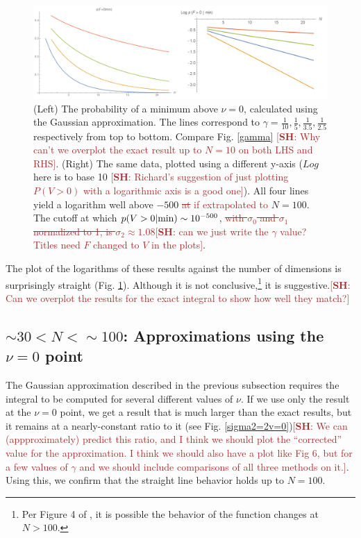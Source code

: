 \documentclass[12pt]{article}
\newcommand{\SH}[1]{\textcolor{brown}{[{\bf SH}: #1]}}
\newcommand{\sh}[1]{\textcolor{brown}{#1}}
\begin{document}
\begin{figure} 
  \centering
  \includegraphics[width=\linewidth]{PVaryingWithNGaussian.png}
  \caption{(Left) The probability of a minimum above $\nu=0$, calculated using the Gaussian approximation. The lines correspond to $\gamma = \frac{1}{10}, \frac{1}{5}, \frac{1}{3.5}, \frac{1}{2.5}$ respectively from top to bottom. Compare Fig. \ref{gamma} \SH{Why can't we overplot the exact result up to $N=10$ on both LHS and RHS}. (Right) The same data, plotted using a different y-axis ($Log$ here is to base 10 \SH{Richard's suggestion of just plotting $P(V>0)$ with a logarithmic axis is a good one}). All four lines yield a logarithm well above $-500$ \sh{\sout{at} if extrapolated to} $N=100$. The cutoff at which $p(V>0|{\rm min}) \sim 10^{-500}$, \sh{\sout{with $\sigma_0$ and $\sigma_1$ normalized to 1,  is $\sigma_2 \approx 1.08$}}\SH{can we just write the $\gamma$ value? Titles need $F$ changed to $V$ in the plots}.}
  \label{PVaryingWithNGaussian}
\end{figure}
  
The plot of the logarithms of these results against the number of dimensions is surprisingly straight (Fig. \ref{PVaryingWithNGaussian}). Although it is not conclusive,\footnote{Per Figure 4 of \cite{Yamada2018}, it is possible the behavior of the function changes at $N >100$.} it is suggestive.\SH{Can we overplot the results for the exact integral to show how well they match?}

\subsection{$\sim 30 < N < \sim100$: Approximations using the $\nu=0$ point}

The Gaussian approximation described in the previous subsection requires the integral to be computed for several different values of $\nu$. If we use only the result at the $\nu=0$ point, we get a result that is much larger than the exact results, but it remains at a nearly-constant ratio to it (see Fig. \ref{sigma2=2v=0})\SH{We can (appproximately) predict this ratio, and I think we should plot the ``corrected'' value for the approximation. I think we should also have a plot like Fig 6, but for a few values of $\gamma$ and we should include comparisons of all three methods on it.}. Using this, we confirm that the straight line behavior holds up to $N = 100$.
\end{document}

